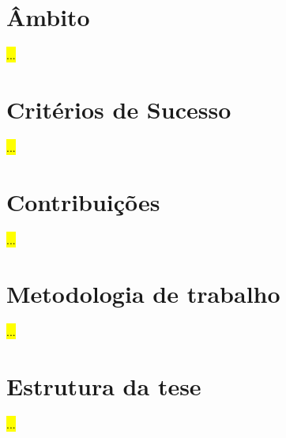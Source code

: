 \section{Âmbito}
\label{sec:chap1_scope}
\hl{...}

\section{Critérios de Sucesso}
\label{sec:chap1_success_criteria}
\hl{...}

\section{Contribuições}
\label{sec:chap1_contribuitions}
\hl{...}

\section{Metodologia de trabalho}
\label{sec:chap1_methodology}
\hl{...}

\section{Estrutura da tese}
\label{sec:chap1_structure}
\hl{...}

